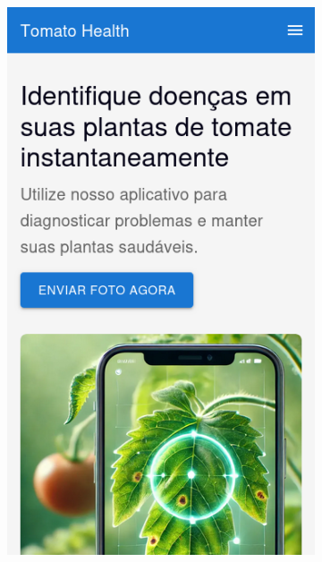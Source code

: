 \begin{figure}[p]
    \centering
    \begin{subfigure}{0.45\textwidth}
        \centering
        \includegraphics[width=\linewidth, height=0.4\textheight, keepaspectratio]{images/homepage1.png}
    \end{subfigure}
    \begin{subfigure}{0.45\textwidth}
        \centering

\end{subfigure}
\end{figure}

